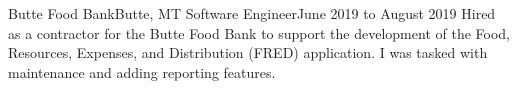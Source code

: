 

\experienceHeading
{Butte Food Bank}{Butte, MT}
{Software Engineer}{June 2019 to August 2019}
\experienceStart
        {Hired as a contractor for the Butte Food Bank to support the development of the Food, Resources, Expenses, and Distribution (FRED) application. I was tasked with maintenance and adding reporting features.}
\experienceEnd
